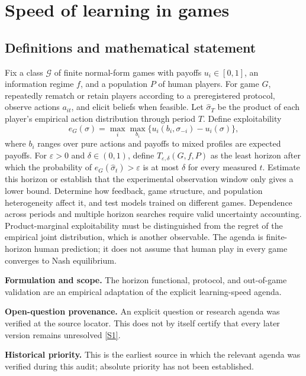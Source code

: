 \documentclass[11pt]{article}
\newcommand{\sref}[2]{\hyperlink{source:#1:#2}{[S#2]}}
\begin{document}
\section*{Speed of learning in games}\label{30007562}
\subsection{Definitions and mathematical statement}
Fix a class \(\mathcal G\) of finite normal-form games with payoffs \(u_i\in[0,1]\), an information regime \(f\), and a population \(P\) of human players. For game \(G\), repeatedly rematch or retain players according to a preregistered protocol, observe actions \(a_{it}\), and elicit beliefs when feasible. Let \(\widehat\sigma_T\) be the product of each player's empirical action distribution through period \(T\). Define exploitability
\[
 e_G(\sigma)=\max_i\max_{b_i}\{u_i(b_i,\sigma_{-i})-u_i(\sigma)\},
\]
where \(b_i\) ranges over pure actions and payoffs to mixed profiles are expected payoffs. For \(\varepsilon>0\) and \(\delta\in(0,1)\), define \(T_{\varepsilon,\delta}(G,f,P)\) as the least horizon after which the probability of \(e_G(\widehat\sigma_t)>\varepsilon\) is at most \(\delta\) for every measured \(t\). Estimate this horizon or establish that the experimental observation window only gives a lower bound. Determine how feedback, game structure, and population heterogeneity affect it, and test models trained on different games. Dependence across periods and multiple horizon searches require valid uncertainty accounting. Product-marginal exploitability must be distinguished from the regret of the empirical joint distribution, which is another observable. The agenda is finite-horizon human prediction; it does not assume that human play in every game converges to Nash equilibrium.

\par\textbf{Formulation and scope.} The horizon functional, protocol, and out-of-game validation are an empirical adaptation of the explicit learning-speed agenda.

\par\textbf{Open-question provenance.} An explicit question or research agenda was verified at the source locator. This does not by itself certify that every later version remains unresolved \sref{30007562}{1}.

\par\textbf{Historical priority.} This is the earliest source in which the relevant agenda was verified during this audit; absolute priority has not been established.
\end{document}
